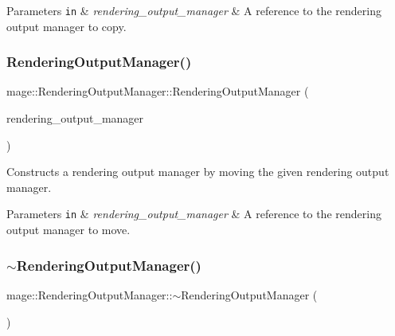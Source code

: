 \begin{DoxyParams}[1]{Parameters}
\mbox{\tt in}  & {\em rendering\+\_\+output\+\_\+manager} & A reference to the rendering output manager to copy. \\
\hline
\end{DoxyParams}
\hypertarget{classmage_1_1_rendering_output_manager_a2ffb191fb849e740921c42638e3ea507}{}\label{classmage_1_1_rendering_output_manager_a2ffb191fb849e740921c42638e3ea507} 
\subsubsection{\texorpdfstring{Rendering\+Output\+Manager()}{RenderingOutputManager()}\hspace{0.1cm}{\footnotesize\ttfamily [3/3]}}
{\footnotesize\ttfamily mage\+::\+Rendering\+Output\+Manager\+::\+Rendering\+Output\+Manager (\begin{DoxyParamCaption}\item[{\hyperlink{classmage_1_1_rendering_output_manager}{Rendering\+Output\+Manager} \&\&}]{rendering\+\_\+output\+\_\+manager }\end{DoxyParamCaption})\hspace{0.3cm}{\ttfamily [default]}}

Constructs a rendering output manager by moving the given rendering output manager.


\begin{DoxyParams}[1]{Parameters}
\mbox{\tt in}  & {\em rendering\+\_\+output\+\_\+manager} & A reference to the rendering output manager to move. \\
\hline
\end{DoxyParams}
\hypertarget{classmage_1_1_rendering_output_manager_ac6c1b4ce353870ea603982623962b2f4}{}\label{classmage_1_1_rendering_output_manager_ac6c1b4ce353870ea603982623962b2f4} 
\subsubsection{\texorpdfstring{$\sim$\+Rendering\+Output\+Manager()}{~RenderingOutputManager()}}
{\footnotesize\ttfamily mage\+::\+Rendering\+Output\+Manager\+::$\sim$\+Rendering\+Output\+Manager (\begin{DoxyParamCaption}{ }\end{DoxyParamCaption})\hspace{0.3cm}{\ttfamily [default]}}

